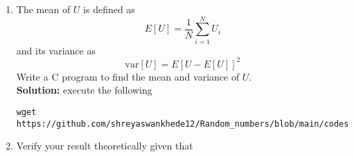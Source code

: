 \documentclass[journal,12pt,twocolumn]{IEEEtran}
\renewcommand\thesection{\arabic{section}}
\providecommand{\pr}[1]{\ensuremath{\Pr\left(#1\right)}}
\providecommand{\sbrak}[1]{\ensuremath{{}\left[#1\right]}}
\theoremstyle{remark}
\newcommand{\solution}{\noindent \textbf{Solution: }}
\numberwithin{equation}{section}
\begin{document}
\begin{enumerate}[label=\thesection.\arabic*
,ref=\thesection.\theenumi]
	The CDF of $U$ is given by
	\begin{align}
		F_{U}(x) = \pr{U \le x} = \int_{-\infty}^x p_{U}(x) ~\mathrm{d}x
	\end{align}
	
	If $x<0$,
	\begin{align}
		\int_{-\infty}^x p_{U}(x) ~\mathrm{d}x = \int_{-\infty}^x 0 ~\mathrm{d}x = 0
	\end{align}
	
	If $c$,
	\begin{align}
		\int_{-\infty}^x p_{U}(x) ~\mathrm{d}x &= \int_{-\infty}^0 0 ~\mathrm{d}x + \int_0^x 1 ~\mathrm{d}x \\
		&= 0 + x \\
		&= x
	\end{align}
	
	If $x>1$,
	\begin{multline}
		\int_{-\infty}^x p_{U}(x) ~\mathrm{d}x \\= \int_{-\infty}^0 0 ~\mathrm{d}x + \int_0^1 1 ~\mathrm{d}x +  \int_1^x 0 ~\mathrm{d}x 
	\end{multline}
	\begin{align}
		\int_{-\infty}^x p_{U}(x) ~\mathrm{d}x &= 0 + 1 + 0 \\
		&= 1
	\end{align}
	
	Therefore, we obtain the CDF of $U$ as
	\begin{align}
		F_{U}(x) = 
		\begin{cases}
			0 & x < 0 \\
			x & 0 \le x \le 1 \label{eq:1.11}\\
			1 & x > 1
		\end{cases}
	\end{align}
\item
The mean of $U$ is defined as
%
\begin{equation}
E\sbrak{U} = \frac{1}{N}\sum_{i=1}^{N}U_i
\end{equation}
%
and its variance as
%
\begin{equation}
\text{var}\sbrak{U} = E\sbrak{U- E\sbrak{U}}^2 
\end{equation}
Write a C program to  find the mean and variance of $U$. \\
\solution execute the following
\begin{lstlisting}
wget https://github.com/shreyaswankhede12/Random_numbers/blob/main/codes/1.4.c
\end{lstlisting}
\item Verify your result theoretically given that
\end{enumerate}
\end{document}

